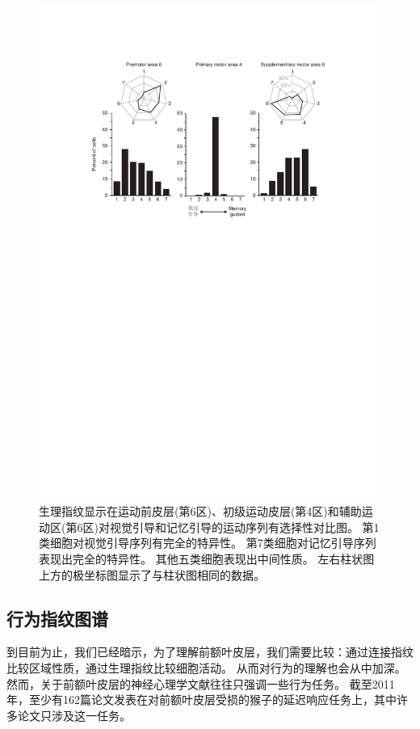 \begin{figure}[!htb]
	\centering
	\includegraphics[width=0.8\linewidth]{chap1/1_10}
	\caption{生理指纹显示在运动前皮层(第6区)、初级运动皮层(第4区)和辅助运动区(第6区)对视觉引导和记忆引导的运动序列有选择性对比图。
		第1类细胞对视觉引导序列有完全的特异性。
		第7类细胞对记忆引导序列表现出完全的特异性。
		其他五类细胞表现出中间性质。
		左右柱状图上方的极坐标图显示了与柱状图相同的数据\cite{mushiake1991neuronal}。\label{fig:1_10}}
\end{figure}


\subsection{行为指纹图谱}

到目前为止，我们已经暗示，为了理解前额叶皮层，我们需要比较：通过连接指纹比较区域性质，通过生理指纹比较细胞活动。
从而对行为的理解也会从中加深。
然而，关于前额叶皮层的神经心理学文献往往只强调一些行为任务。
截至2011年，至少有162篇论文发表在对前额叶皮层受损的猴子的延迟响应任务上，其中许多论文只涉及这一任务。


